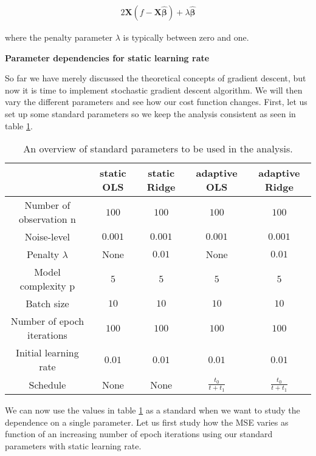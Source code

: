 \documentclass[12pt,a4paper]{article}
\begin{document}
\begin{equation}\label{eq:MSEderSTOridge}
\begin{aligned}
2 \textbf{X}(f - \textbf{X}\boldsymbol{\hat{\beta}}) + \lambda \boldsymbol{\hat{\beta}}
\end{aligned}
\end{equation}

\noindent where the penalty parameter $\lambda$ is typically between zero and one. 

\begin{center}
\large{\textbf{Parameter dependencies for static learning rate}}
\end{center}

\noindent So far we have merely discussed the theoretical concepts of gradient descent, but now it is time to implement stochastic gradient descent algorithm. We will then vary the different parameters and see how our cost function changes. First, let us set up some standard parameters so we keep the analysis consistent as seen in table \ref{tab:standardParam}.

\begin{table}[h]
\caption{\label{tab:standardParam} An overview of standard parameters to be used in the analysis.}
\centering
\begin{tabular}{c|c|c|c|c}
 & static OLS & static Ridge & adaptive OLS & adaptive Ridge\\
\hline
Number of observation n & $100$ & $100$ & $100$ & $100$\\
\hline
Noise-level & $0.001$ & $0.001$ & $0.001$ & $0.001$\\
\hline
Penalty $\lambda$ & None & $0.01$ & None & $0.01$\\
\hline
Model complexity p & $5$ & $5$ & $5$ & $5$\\
\hline
Batch size & $10$ & $10$ & $10$ & $10$\\
\hline
Number of epoch iterations & $100$ & $100$ & $100$ & $100$\\
\hline
Initial learning rate & $0.01$ & $0.01$ & $0.01$ & $0.01$\\
\hline
Schedule & None & None & $\frac{t_0}{t+t_1}$ & $\frac{t_0}{t+t_1}$\\
\end{tabular}
\end{table}

\noindent We can now use the values in table \ref{tab:standardParam} as a standard when we want to study the dependence on a single parameter. Let us first study how the MSE varies as function of an increasing number of epoch iterations using our standard parameters with static learning rate.
\end{document}
